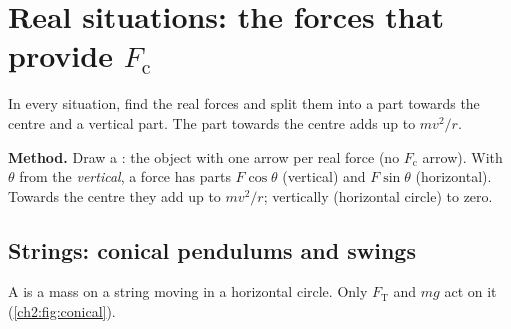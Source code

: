 \section{Real situations: the forces that provide \texorpdfstring{$F_\mathrm{c}$}{Fc}}\label{ch2:sec:situations}

\begin{bigidea}
In every situation, find the real forces and split them into a part towards the centre
and a vertical part. The part towards the centre adds up to $mv^2/r$.
\end{bigidea}

\begin{keywords}
\end{keywords}

\textbf{Method.} Draw a : the object with one arrow per real force (no
$F_\mathrm{c}$ arrow).
With $\theta$ from the \emph{vertical}, a force has parts $F\cos\theta$ (vertical) and
$F\sin\theta$ (horizontal). Towards the centre they add up to $mv^2/r$; vertically
(horizontal circle) to zero.

\subsection*{Strings: conical pendulums and swings}
A  is a mass on a string moving in a horizontal circle. Only
$F_\mathrm{T}$ and $mg$ act on it (\cref{ch2:fig:conical}).

